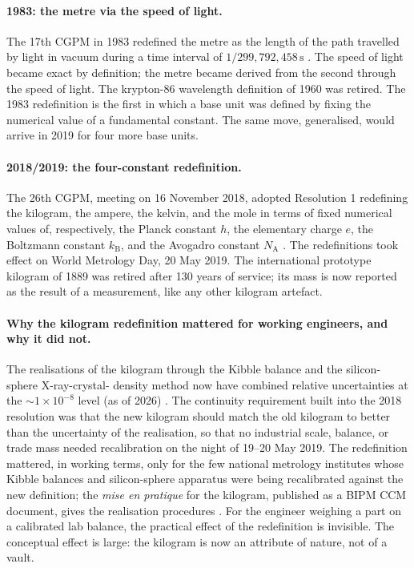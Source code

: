 \paragraph{1983: the metre via the speed of light.} The 17th CGPM
in 1983 redefined the metre as the length of the path travelled by
light in vacuum during a time interval of
$1/299{,}792{,}458 \,\si{\second}$ \cite{web:ch02t3-bipm-cgpm-1983}.
The speed of light became exact by definition; the metre became
derived from the second through the speed of light. The
krypton-86 wavelength definition of 1960 was retired. The 1983
redefinition is the first in which a base unit was defined by
fixing the numerical value of a fundamental constant. The same
move, generalised, would arrive in 2019 for four more base units.

\paragraph{2018/2019: the four-constant redefinition.} The 26th
CGPM, meeting on 16 November 2018, adopted Resolution 1 redefining
the kilogram, the ampere, the kelvin, and the mole in terms of
fixed numerical values of, respectively, the Planck constant $h$,
the elementary charge $e$, the Boltzmann constant $k_{\text{B}}$,
and the Avogadro constant $N_{\text{A}}$
\cite{web:ch02t3-bipm-comptes-rendus-2018, paper:stock-kibble-2018}.
The redefinitions took effect on World Metrology Day, 20 May 2019.
The international prototype kilogram of 1889 was retired after 130
years of service; its mass is now reported as the result of a
measurement, like any other kilogram artefact.

\paragraph{Why the kilogram redefinition mattered for working
engineers, and why it did not.} The realisations of the kilogram
through the Kibble balance and the silicon-sphere X-ray-crystal-
density method now have combined relative uncertainties at the
$\sim 1 \times 10^{-8}$ level (as of 2026)
\cite{web:bipm-mise-en-pratique-kilogram-2019,
web:nist-kibble-balance}. The continuity requirement built into
the 2018 resolution was that the new kilogram should match the old
kilogram to better than the uncertainty of the realisation, so
that no industrial scale, balance, or trade mass needed
recalibration on the night of 19--20 May 2019. The redefinition
mattered, in working terms, only for the few national metrology
institutes whose Kibble balances and silicon-sphere apparatus were
being recalibrated against the new definition; the
\emph{mise en pratique} for the kilogram, published as a BIPM CCM
document, gives the realisation procedures
\cite{web:bipm-mise-en-pratique-kilogram-2019}. For the engineer
weighing a part on a calibrated lab balance, the practical effect
of the redefinition is invisible. The conceptual effect is large:
the kilogram is now an attribute of nature, not of a vault.

